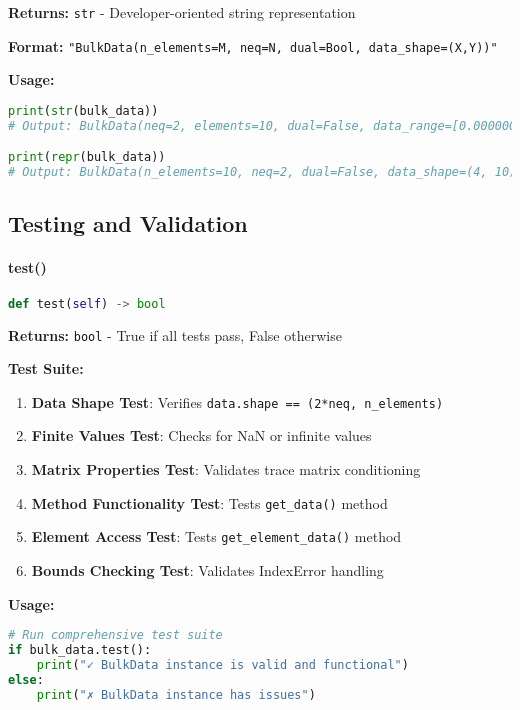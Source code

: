 \textbf{Returns:} \texttt{str} - Developer-oriented string representation

\textbf{Format:} \texttt{"BulkData(n\_elements=M, neq=N, dual=Bool, data\_shape=(X,Y))"}

\textbf{Usage:}
\begin{lstlisting}[language=Python, caption=String Methods Usage]
print(str(bulk_data))
# Output: BulkData(neq=2, elements=10, dual=False, data_range=[0.000000e+00, 1.234567e+00])

print(repr(bulk_data))
# Output: BulkData(n_elements=10, neq=2, dual=False, data_shape=(4, 10))
\end{lstlisting}

\subsection{Testing and Validation}
\label{subsec:testing_method}

\paragraph{test()}\leavevmode
\begin{lstlisting}[language=Python, caption=Test Method]
def test(self) -> bool
\end{lstlisting}

\textbf{Returns:} \texttt{bool} - True if all tests pass, False otherwise

\textbf{Test Suite:}
\begin{enumerate}
    \item \textbf{Data Shape Test}: Verifies \texttt{data.shape == (2*neq, n\_elements)}
    \item \textbf{Finite Values Test}: Checks for NaN or infinite values
    \item \textbf{Matrix Properties Test}: Validates trace matrix conditioning
    \item \textbf{Method Functionality Test}: Tests \texttt{get\_data()} method
    \item \textbf{Element Access Test}: Tests \texttt{get\_element\_data()} method
    \item \textbf{Bounds Checking Test}: Validates IndexError handling
\end{enumerate}

\textbf{Usage:}
\begin{lstlisting}[language=Python, caption=Test Method Usage]
# Run comprehensive test suite
if bulk_data.test():
    print("✓ BulkData instance is valid and functional")
else:
    print("✗ BulkData instance has issues")
\end{lstlisting}

